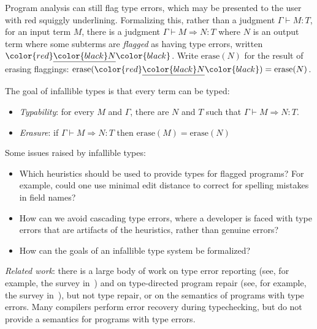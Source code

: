\documentclass[acmsmall]{acmart}
\newcommand{\squnder}[1]{\color{red}\underline{{\color{black}#1}}\color{black}}
\newcommand{\infer}[2]{\frac{\textstyle#1}{\textstyle#2}}
\newcommand{\erase}{\mathrm{erase}}
\begin{document}
Program analysis can still flag type errors, which may be presented
to the user with red squiggly underlining. Formalizing this, rather
than a judgment
$\Gamma\vdash M:T$, for an input term $M$, there is a judgment
$\Gamma \vdash M \Rightarrow N : T$ where $N$ is an output term
where some subterms are \emph{flagged} as having type errors, written $\squnder{N}$. Write $\erase(N)$
for the result of erasing flaggings: $\erase(\squnder{N}) = \erase(N)$.


The goal of infallible types is that every term can be typed:
\begin{itemize}
\item \emph{Typability}: for every $M$ and $\Gamma$,
  there are $N$ and $T$ such that $\Gamma \vdash M \Rightarrow N : T$.
\item \emph{Erasure}: if $\Gamma \vdash M \Rightarrow N : T$
  then $\erase(M) = \erase(N)$ 
\end{itemize}
Some issues raised by infallible types:
\begin{itemize}
\item Which heuristics should be used to provide types for flagged programs? For example, could one
  use minimal edit distance to correct for spelling mistakes in field names?
\item How can we avoid cascading type errors, where a developer is
  faced with type errors that are artifacts of the heuristics, rather
  than genuine errors?
\item How can the goals of an infallible type system be formalized?
\end{itemize}
\emph{Related work}:
there is a large body of work on type error reporting
(see, for example, the survey in~\cite[Ch.~3]{TopQuality})
and on type-directed program repair
(see, for example, the survey in~\cite[Ch.~3]{RepairingTypeErrors}),
but not type repair, or on
the semantics of programs with type errors. Many compilers perform
error recovery during typechecking, but do not provide a semantics
for programs with type errors.
\end{document}
